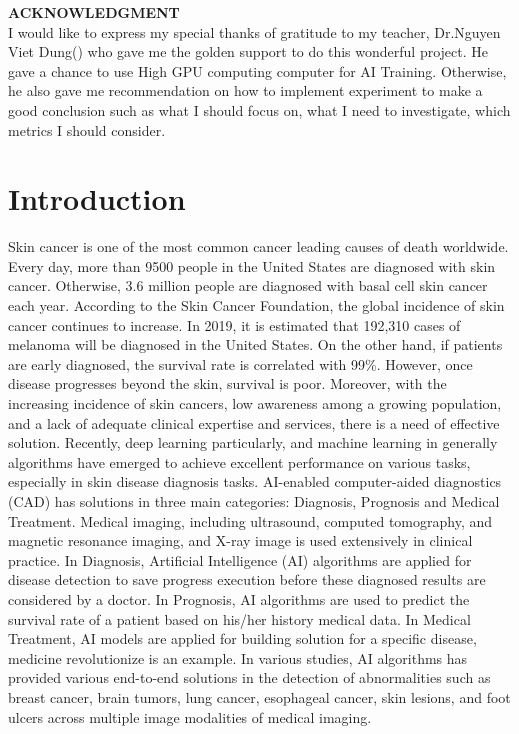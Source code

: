 \textbf{ACKNOWLEDGMENT} \\ 
I would like to express my special thanks of gratitude to my teacher, Dr.Nguyen Viet Dung() who gave me the golden support to do this wonderful project. He gave a chance to use High GPU computing computer for AI Training. Otherwise, he also gave me recommendation on how to implement experiment to make a good conclusion such as what I should focus on, what I need to investigate, which metrics I should consider.  
\section{Introduction}
Skin cancer is one of the most common cancer leading causes of death worldwide. Every day, more than 9500\cite{03358} people in the United States are diagnosed with skin cancer. Otherwise, 3.6\cite{03358} million people are diagnosed with basal cell skin cancer each year. According to the Skin Cancer Foundation, the global incidence of skin cancer continues to increase\cite{11872}. In 2019, it is estimated that 192,310 cases of melanoma will be diagnosed in the United States\cite{11872}. On the other hand, if patients are early diagnosed, the survival rate is correlated with 99\%. However, once disease progresses beyond the skin, survival is poor\cite{11872}. Moreover, with the increasing
incidence of skin cancers, low awareness among a growing population, and a lack of adequate clinical expertise and services, there is a need of effective solution. \newline
Recently, deep learning particularly, and machine learning in generally algorithms have emerged to achieve excellent performance on various tasks, especially in skin disease diagnosis tasks. AI-enabled computer-aided diagnostics (CAD) has solutions in three main categories: Diagnosis, Prognosis and Medical Treatment. Medical imaging, including ultrasound, computed tomography, and magnetic resonance imaging, and X-ray image is used extensively in clinical practice. In Diagnosis, Artificial Intelligence (AI) algorithms are applied for disease detection to save progress execution before these diagnosed results are considered by a doctor. In Prognosis, AI algorithms are used to predict the survival rate of a patient based on his/her history medical data. In Medical Treatment, AI models are applied for building solution for a specific disease, medicine revolutionize is an example. In various studies, AI algorithms has provided various end-to-end solutions in the detection of abnormalities such as breast cancer, brain tumors, lung cancer, esophageal cancer, skin lesions, and foot ulcers across multiple image modalities of medical imaging\cite{11872}. \newline
